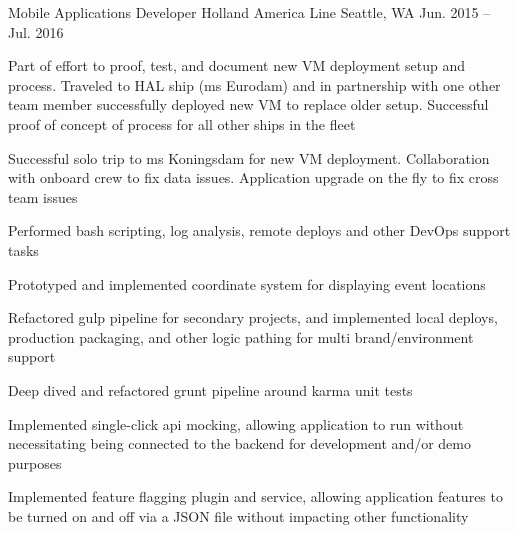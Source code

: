 \begin{cventries}
  \cventry
    {Mobile Applications Developer} %
    {Holland America Line} %
    {Seattle, WA} %
    {Jun. 2015 – Jul. 2016} %
    {
      \begin{cvitems} %
        \item {Part of effort to proof, test, and document new VM deployment setup and process. Traveled to HAL ship (ms Eurodam) and in partnership with one other team member successfully deployed new VM to replace older setup. Successful proof of concept of process for all other ships in the fleet}
        \item {Successful solo trip to ms Koningsdam for new VM deployment. Collaboration with onboard crew to fix data issues. Application upgrade on the fly to fix cross team issues}
        \item {Performed bash scripting, log analysis, remote deploys and other DevOps support tasks}
        \item {Prototyped and implemented coordinate system for displaying event locations}
        \item {Refactored gulp pipeline for secondary projects, and implemented local deploys, production packaging, and other logic pathing for multi brand/environment support}
        \item {Deep dived and refactored grunt pipeline around karma unit tests}
        \item {Implemented single-click api mocking, allowing application to run without necessitating being connected to the backend for development and/or demo purposes}
        \item {Implemented feature flagging plugin and service, allowing application features to be turned on and off via a JSON file without impacting other functionality}
      \end{cvitems}
    }

\end{cventries}
